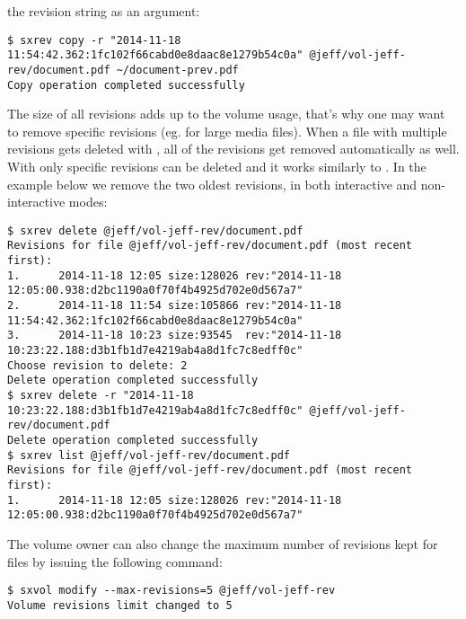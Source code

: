 the revision string as an argument:
\begin{lstlisting}
$ sxrev copy -r "2014-11-18 11:54:42.362:1fc102f66cabd0e8daac8e1279b54c0a" @jeff/vol-jeff-rev/document.pdf ~/document-prev.pdf
Copy operation completed successfully
\end{lstlisting}
The size of all revisions adds up to the volume usage, that's why one may want
to remove specific revisions (eg. for large media files). When a file with
multiple revisions gets deleted with , all of the revisions get
removed automatically as well. With  only specific revisions
can be deleted and it works similarly to . In the example
below we remove the two oldest revisions, in both interactive and
non-interactive modes:
\begin{lstlisting}
$ sxrev delete @jeff/vol-jeff-rev/document.pdf
Revisions for file @jeff/vol-jeff-rev/document.pdf (most recent first):
1.      2014-11-18 12:05 size:128026 rev:"2014-11-18 12:05:00.938:d2bc1190a0f70f4b4925d702e0d567a7"
2.      2014-11-18 11:54 size:105866 rev:"2014-11-18 11:54:42.362:1fc102f66cabd0e8daac8e1279b54c0a"
3.      2014-11-18 10:23 size:93545  rev:"2014-11-18 10:23:22.188:d3b1fb1d7e4219ab4a8d1fc7c8edff0c"
Choose revision to delete: 2
Delete operation completed successfully
$ sxrev delete -r "2014-11-18 10:23:22.188:d3b1fb1d7e4219ab4a8d1fc7c8edff0c" @jeff/vol-jeff-rev/document.pdf
Delete operation completed successfully
$ sxrev list @jeff/vol-jeff-rev/document.pdf
Revisions for file @jeff/vol-jeff-rev/document.pdf (most recent first):
1.      2014-11-18 12:05 size:128026 rev:"2014-11-18 12:05:00.938:d2bc1190a0f70f4b4925d702e0d567a7"
\end{lstlisting}
The volume owner can also change the maximum number of revisions kept for files
by issuing the following command:
\begin{lstlisting}
$ sxvol modify --max-revisions=5 @jeff/vol-jeff-rev
Volume revisions limit changed to 5
\end{lstlisting}
